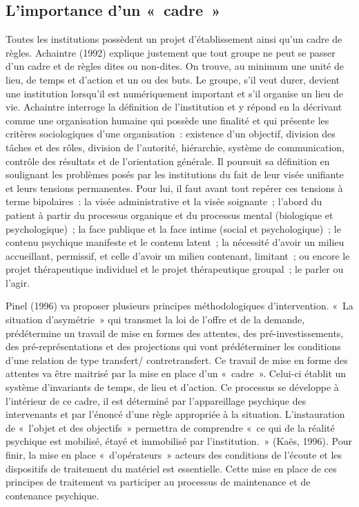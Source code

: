 \documentclass[12pt, a4paper]{book}
\begin{document}
\begin{spacing}{1.5}
\subsection{L'importance d'un « cadre »}

Toutes les institutions possèdent un projet d'établissement ainsi qu'un cadre de règles. Achaintre (1992) explique justement que tout groupe ne peut se passer d'un cadre et de règles dites ou non-dites. On trouve, au minimum une unité de lieu, de temps et d'action et un ou des buts. Le groupe, s'il veut durer, devient une institution lorsqu'il est numériquement important et s'il organise un lieu de vie. Achaintre interroge la définition de l'institution et y répond en la décrivant comme une organisation humaine qui possède une finalité et qui présente les critères sociologiques d'une organisation : existence d'un objectif, division des tâches et des rôles, division de l'autorité, hiérarchie, système de communication, contrôle des résultats et de l'orientation générale. Il poursuit sa définition en soulignant les problèmes posés par les institutions du fait de leur visée unifiante et leurs tensions permanentes. Pour lui, il faut avant tout repérer ces tensions à terme bipolaires : la visée administrative et la visée soignante ; l'abord du patient à partir du processus organique et du processus mental (biologique et psychologique) ; la face publique et la face intime (social et psychologique) ; le contenu psychique manifeste et le contenu latent ; la nécessité d'avoir un milieu accueillant, permissif, et celle d'avoir un milieu contenant, limitant ; ou encore le projet thérapeutique individuel  et le projet thérapeutique groupal ; le parler ou l'agir.

Pinel (1996) va proposer plusieurs principes méthodologiques d'intervention. « La situation d'asymétrie » qui transmet la loi de l'offre et de la demande, prédétermine un travail de mise en formes des attentes, des pré-investissements, des pré-représentations et des projections qui vont prédéterminer les conditions d'une relation de type transfert/ contretransfert. Ce travail de mise en forme des attentes va être maitrisé par la mise en place d'un « cadre ». Celui-ci établit un système d'invariants de temps, de lieu et d'action. Ce processus se développe à l'intérieur de ce cadre, il est déterminé par l'appareillage psychique des intervenants et par l'énoncé d'une règle appropriée à la situation. L'instauration de « l'objet et des objectifs » permettra de comprendre « ce qui de la réalité psychique est mobilisé, étayé et immobilisé par l'institution. » (Kaës, 1996). Pour finir, la mise en place « d'opérateurs » acteurs des  conditions de l'écoute et les dispositifs de traitement du matériel est essentielle. Cette mise  en place de ces principes de traitement va participer au processus de maintenance et de contenance psychique.


\end{spacing}
\end{document}
